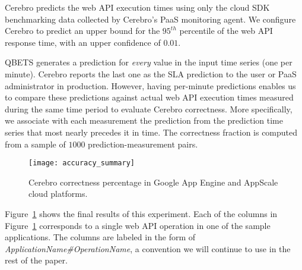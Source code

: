 Cerebro predicts the web API execution times using only the cloud SDK
benchmarking data collected by Cerebro's PaaS monitoring agent. 
We configure Cerebro to predict an
upper bound for the $95^{th}$ percentile of the web API response time, with an
upper confidence of $0.01$. 

QBETS generates a prediction for \textit{every} value in the input time series 
(one per minute).  Cerebro reports the last one as the SLA prediction to the
user or PaaS administrator in production.  However, having per-minute predictions 
enables us to compare these predictions against actual web API execution
times measured during the same time period to evaluate Cerebro correctness. 
More specifically, we
associate with each measurement the prediction from the prediction time series
that most nearly precedes it in time.  The correctness fraction is computed
from a sample of $1000$ prediction-measurement pairs.


\begin{figure}
\centering
\texttt{[image: accuracy\_summary]}
\caption{Cerebro correctness percentage in Google App Engine and AppScale cloud platforms.}
\label{fig:accuracy_summary}
\vspace{-0.2in}
\end{figure}

Figure~\ref{fig:accuracy_summary} shows the final results of this experiment.
Each of the columns in Figure~\ref{fig:accuracy_summary} corresponds 
to a single web API operation in 
one of the sample applications. The columns are labeled in the 
form of \textit{ApplicationName\#OperationName}, a convention 
we will continue to use in the rest of the paper. %

